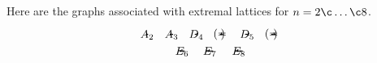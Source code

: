Here are the graphs associated with extremal lattices for $n=2\c \dotsc\c 8$.
\begin{gather*}
\begin{picture}(1,2)(0,-1)
\put(0,0){\circle*{0.2}}
\put(1,0){\circle*{0.2}}
\put(0,0){\line(1,0){1}}
\put(0.5,-0.5){\makebox(0,0){$A_2$}}
\end{picture}
\qquad
\begin{picture}(2,2)(0,-1)
\put(0,0){\circle*{0.2}}
\put(1,0){\circle*{0.2}}
\put(2,0){\circle*{0.2}}
\put(0,0){\line(1,0){2}}
\put(1,-0.5){\makebox(0,0){$A_3$}}
\end{picture}
\qquad
\begin{picture}(1.707,2)(0,-1)
\put(0,0){\circle*{0.2}}
\put(1,0){\circle*{0.2}}
\put(1.707,0.707){\circle*{0.2}}
\put(1.707,-0.707){\circle*{0.2}}
\put(0,0){\line(1,0){1}}
\put(1,0){\line(1,1){0.707}}
\put(1,0){\line(1,-1){0.707}}
\put(0.854,-0.5){\makebox(0,0){$D_4$}}
\end{picture}
\qquad
\begin{picture}(2.6,2)(-0.4,-1)
\put(0,0){\circle*{0.2}}
\put(1,0){\circle*{0.2}}
\put(2,0){\circle*{0.2}}
\put(1,1){\circle*{0.2}}
\put(0,0){\line(1,0){2}}
\put(1,0){\line(0,1){1}}
\put(-0.4,0){\makebox(0,0){$(=$}}
\put(2.2,0){\makebox(0,0){$)$}}
\end{picture}
\qquad
\begin{picture}(2.707,2)(0,-1)
\put(0,0){\circle*{0.2}}
\put(1,0){\circle*{0.2}}
\put(2,0){\circle*{0.2}}
\put(2.707,0.707){\circle*{0.2}}
\put(2.707,-0.707){\circle*{0.2}}
\put(0,0){\line(1,0){2}}
\put(2,0){\line(1,1){0.707}}
\put(2,0){\line(1,-1){0.707}}
\put(1.353,-0.5){\makebox(0,0){$D_5$}}
\end{picture}
\qquad
\begin{picture}(3.6,2)(-0.4,-1)
\put(0,0){\circle*{0.2}}
\put(1,0){\circle*{0.2}}
\put(2,0){\circle*{0.2}}
\put(3,0){\circle*{0.2}}
\put(2,1){\circle*{0.2}}
\put(0,0){\line(1,0){3}}
\put(2,0){\line(0,1){1}}
\put(-0.4,0){\makebox(0,0){$(=$}}
\put(3.2,0){\makebox(0,0){$)$}}
\end{picture}
\\
\begin{picture}(4,2)(0,-1)
\multiput(0,0)(1,0){5}{\circle*{0.2}}
\put(2,1){\circle*{0.2}}
\put(0,0){\line(1,0){4}}
\put(2,0){\line(0,1){1}}
\put(2,-0.5){\makebox(0,0){$E_6$}}
\end{picture}
\qquad
\begin{picture}(5,2)(0,-1)
\multiput(0,0)(1,0){6}{\circle*{0.2}}
\put(2,1){\circle*{0.2}}
\put(0,0){\line(1,0){5}}
\put(2,0){\line(0,1){1}}
\put(2.5,-0.5){\makebox(0,0){$E_7$}}
\end{picture}
\qquad
\begin{picture}(6,2)(0,-1)
\multiput(0,0)(1,0){7}{\circle*{0.2}}
\put(2,1){\circle*{0.2}}
\put(0,0){\line(1,0){6}}
\put(2,0){\line(0,1){1}}
\put(3,-0.5){\makebox(0,0){$E_8$}}
\end{picture}
\end{gather*}


